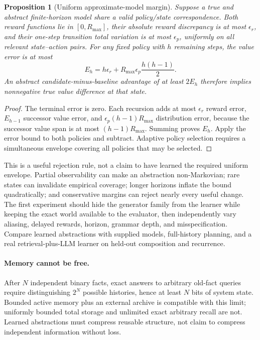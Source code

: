 \documentclass[10pt,twocolumn]{article}
\newtheorem{proposition}[theorem]{Proposition}
\begin{document}
\begin{proposition}[Uniform approximate-model margin]\label{thm:approx}
Suppose a true and abstract finite-horizon model share a valid policy/state
correspondence. Both reward functions lie in $[0,R_{\max}]$, their absolute
reward discrepancy is at most $\epsilon_r$, and their one-step transition total
variation is at most $\epsilon_p$, uniformly on all relevant state--action pairs.
For any fixed policy with $h$ remaining steps, the value error is at most
\begin{equation}
 E_h=h\epsilon_r+R_{\max}\epsilon_p\frac{h(h-1)}2.
\end{equation}
An abstract candidate-minus-baseline advantage of at least $2E_h$ therefore
implies nonnegative true value difference at that state.
\end{proposition}
\begin{proof}
The terminal error is zero. Each recursion adds at most $\epsilon_r$ reward
error, $E_{h-1}$ successor value error, and
$\epsilon_p(h-1)R_{\max}$ distribution error, because the successor value span
is at most $(h-1)R_{\max}$. Summing proves $E_h$. Apply the error bound to both
policies and subtract. Adaptive policy selection requires a simultaneous envelope
covering all policies that may be selected.
\end{proof}

This is a useful rejection rule, not a claim to have learned the required
uniform envelope. Partial observability can make an abstraction non-Markovian;
rare states can invalidate empirical coverage; longer horizons inflate the bound
quadratically; and conservative margins can reject nearly every useful change.
The first experiment should hide the generator family from the learner while
keeping the exact world available to the evaluator, then independently vary
aliasing, delayed rewards, horizon, grammar depth, and misspecification. Compare
learned abstractions with supplied models, full-history planning, and a real
retrieval-plus-LLM learner on held-out composition and recurrence.

\paragraph{Memory cannot be free.}
After $N$ independent binary facts, exact answers to arbitrary old-fact queries
require distinguishing $2^N$ possible histories, hence at least $N$ bits of system
state. Bounded active memory plus an external archive is compatible with this
limit; uniformly bounded total storage and unlimited exact arbitrary recall are
not. Learned abstractions must compress reusable structure, not claim to compress
independent information without loss.
\end{document}
